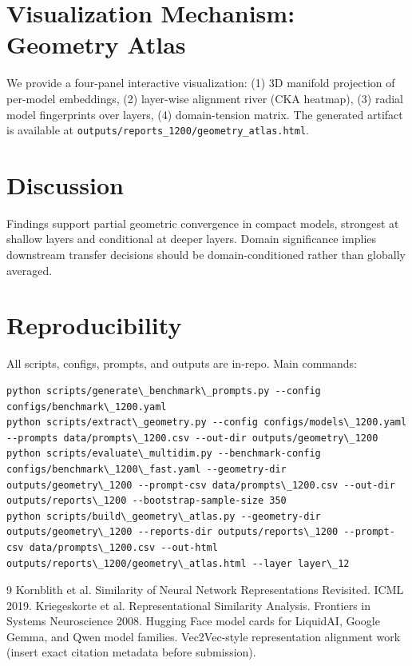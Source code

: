 ﻿\documentclass[11pt]{article}
\begin{document}
\section{Visualization Mechanism: Geometry Atlas}
We provide a four-panel interactive visualization:
(1) 3D manifold projection of per-model embeddings,
(2) layer-wise alignment river (CKA heatmap),
(3) radial model fingerprints over layers,
(4) domain-tension matrix.
The generated artifact is available at \texttt{outputs/reports\_1200/geometry\_atlas.html}.

\section{Discussion}
Findings support partial geometric convergence in compact models, strongest at shallow layers and conditional at deeper layers. Domain significance implies downstream transfer decisions should be domain-conditioned rather than globally averaged.

\section{Reproducibility}
All scripts, configs, prompts, and outputs are in-repo. Main commands:
\begin{verbatim}
python scripts/generate\_benchmark\_prompts.py --config configs/benchmark\_1200.yaml
python scripts/extract\_geometry.py --config configs/models\_1200.yaml --prompts data/prompts\_1200.csv --out-dir outputs/geometry\_1200
python scripts/evaluate\_multidim.py --benchmark-config configs/benchmark\_1200\_fast.yaml --geometry-dir outputs/geometry\_1200 --prompt-csv data/prompts\_1200.csv --out-dir outputs/reports\_1200 --bootstrap-sample-size 350
python scripts/build\_geometry\_atlas.py --geometry-dir outputs/geometry\_1200 --reports-dir outputs/reports\_1200 --prompt-csv data/prompts\_1200.csv --out-html outputs/reports\_1200/geometry\_atlas.html --layer layer\_12
\end{verbatim}


\begin{thebibliography}{9}
Kornblith et al. Similarity of Neural Network Representations Revisited. ICML 2019.
Kriegeskorte et al. Representational Similarity Analysis. Frontiers in Systems Neuroscience 2008.
Hugging Face model cards for LiquidAI, Google Gemma, and Qwen model families.
Vec2Vec-style representation alignment work (insert exact citation metadata before submission).
\end{thebibliography}
\end{document}
